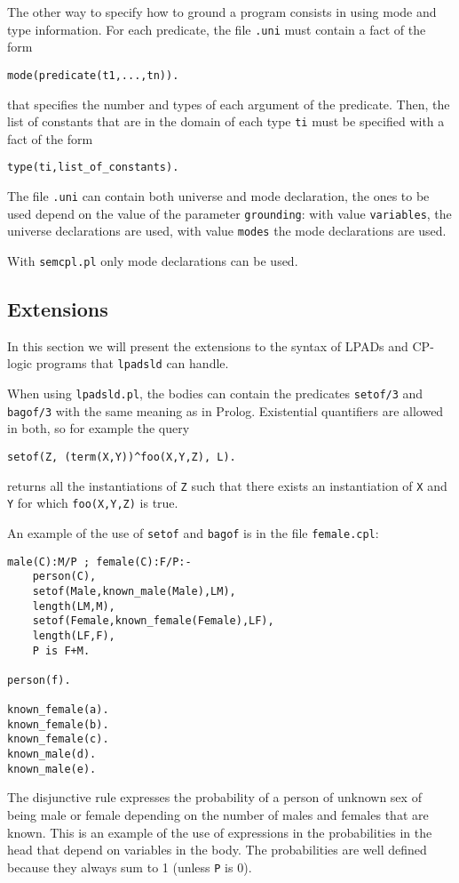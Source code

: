 \documentclass[a4paper,10pt]{scrartcl}
\begin{document}
The other way to specify how to ground a program consists in using mode and type information. For each predicate, the file \texttt{.uni} must contain a fact of the form
\begin{verbatim}
mode(predicate(t1,...,tn)).
\end{verbatim}
that specifies the number and types of each argument of the predicate. Then, the list of constants that
are in the domain of each type \texttt{ti} must be specified with a fact of the form
\begin{verbatim}
type(ti,list_of_constants).
\end{verbatim}
The file \texttt{.uni} can contain both universe and mode declaration, the ones to be used depend on the value of the parameter \texttt{grounding}: with value \texttt{variables}, the universe declarations are used, with value \texttt{modes} the mode declarations are used.

With \texttt{semcpl.pl} only mode declarations can be used.


\subsection{Extensions}
In this section we will present the extensions to the syntax of LPADs and CP-logic programs that \texttt{lpadsld} can handle.

When using \texttt{lpadsld.pl}, the bodies can contain the predicates \texttt{setof/3} and \texttt{bagof/3} with the same meaning as in Prolog. Existential quantifiers are allowed in both, so for example the query
\begin{verbatim}
setof(Z, (term(X,Y))^foo(X,Y,Z), L).
\end{verbatim}
returns all the instantiations of \texttt{Z} such that there exists an instantiation of \texttt{X} and \texttt{Y} for which \texttt{foo(X,Y,Z)} is true.

An example of the use of \texttt{setof} and \texttt{bagof} is in the file \texttt{female.cpl}:
\begin{verbatim}
male(C):M/P ; female(C):F/P:-
    person(C),
    setof(Male,known_male(Male),LM),
    length(LM,M),
    setof(Female,known_female(Female),LF),
    length(LF,F),
    P is F+M.

person(f).

known_female(a).
known_female(b).
known_female(c).
known_male(d).
known_male(e).
\end{verbatim}
The disjunctive rule expresses the probability of a person of unknown sex of being male or female depending on the number of males and females that are known.
This is an example of the use of expressions in the probabilities in the head that depend on variables in the body. The probabilities are well defined because they always sum to 1 (unless \texttt{P} is 0).
\end{document}
